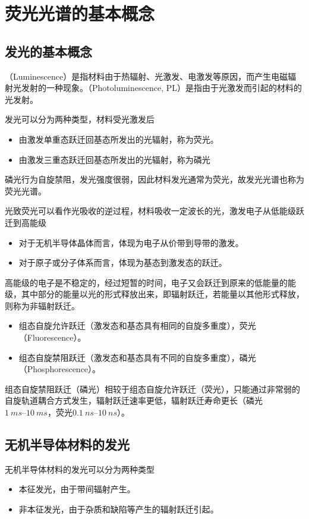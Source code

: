 \section{荧光光谱的基本概念}

\subsection{发光的基本概念}
（Luminescence）是指材料由于热辐射、光激发、电激发等原因，而产生电磁辐射光发射的一种现象。（Photoluminescence, PL）是指由于光激发而引起的材料的光发射。

发光可以分为两种类型，材料受光激发后
\begin{itemize}
    \item 由激发单重态跃迁回基态所发出的光辐射，称为荧光。
    \item 由激发三重态跃迁回基态所发出的光辐射，称为磷光
\end{itemize}
磷光行为自旋禁阻，发光强度很弱，因此材料发光通常为荧光，故发光光谱也称为荧光光谱。

光致荧光可以看作光吸收的逆过程，材料吸收一定波长的光，激发电子从低能级跃迁到高能级
\begin{itemize}
    \item 对于无机半导体晶体而言，体现为电子从价带到导带的激发。
    \item 对于原子或分子体系而言，体现为基态到激发态的跃迁。
\end{itemize}
高能级的电子是不稳定的，经过短暂的时间，电子又会跃迁到原来的低能量的能级，其中部分的能量以光的形式释放出来，即辐射跃迁，若能量以其他形式释放，则称为非辐射跃迁。

\begin{itemize}
    \item 组态自旋允许跃迁（激发态和基态具有相同的自旋多重度），荧光（Fluorescence）。
    \item 组态自旋禁阻跃迁（激发态和基态具有不同的自旋多重度），磷光（Phosphorescence）。
\end{itemize}

组态自旋禁阻跃迁（磷光）相较于组态自旋允许跃迁（荧光），只能通过非常弱的自旋轨道耦合方式发生，辐射跃迁速率更低，辐射跃迁寿命更长（磷光$\SIrange{1}{10}{ms}$，荧光$\SIrange{0.1}{10}{ns}$）。

\subsection{无机半导体材料的发光}

无机半导体材料的发光可以分为两种类型
\begin{itemize}
    \item 本征发光，由于带间辐射产生。
    \item 非本征发光，由于杂质和缺陷等产生的辐射跃迁引起。
\end{itemize}

